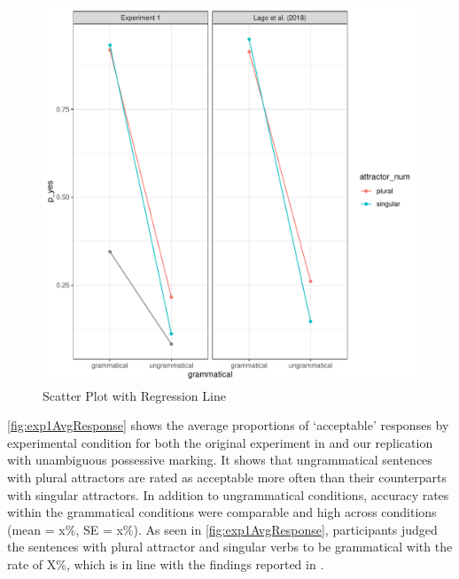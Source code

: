 \documentclass[a4paper,man,natbib]{apa6}\usepackage[]{graphicx}\usepackage[]{color}
\makeatletter
\def\maxwidth{ %
  \ifdim\Gin@nat@width>\linewidth
    \linewidth
  \else
    \Gin@nat@width
  \fi
}
\newenvironment{knitrout}{}{} %
\makeatother
\begin{document}
\begin{figure}
\begin{center}
\begin{knitrout}
\color{fgcolor}
\includegraphics[width=\maxwidth]{figure/fig1-1} 

\end{knitrout}
\end{center}
\caption{Scatter Plot with Regression Line}
\label{fig:one}
\end{figure}

\autoref{fig:exp1AvgResponse} shows the average proportions of ‘acceptable’ responses by experimental condition for both the original experiment in \citet{LagoEtAl:2018} and our replication with unambiguous possessive marking. It shows that ungrammatical sentences with plural attractors are rated as acceptable more often than their counterparts with singular attractors. In addition to ungrammatical conditions, accuracy rates within the grammatical conditions were comparable and high across conditions (mean = x\%, SE = x\%). As seen in \autoref{fig:exp1AvgResponse}, participants judged the sentences with plural attractor and singular verbs to be grammatical with the rate of X\%, which is in line with the findings reported in \citet{LagoEtAl:2018}.    
\end{document}
